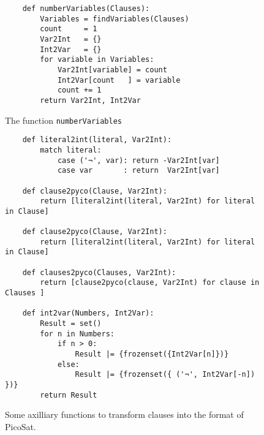 \begin{figure}[!ht]
\centering
\begin{verbatim}
    def numberVariables(Clauses):
        Variables = findVariables(Clauses)
        count     = 1
        Var2Int   = {}
        Int2Var   = {}
        for variable in Variables:
            Var2Int[variable] = count
            Int2Var[count   ] = variable
            count += 1
        return Var2Int, Int2Var             
\end{verbatim}
\vspace*{-0.3cm}
\caption{The function \texttt{numberVariables}}
\label{fig:sudoku-numberVariables}
\end{figure}

\begin{figure}[!ht]
\centering
\begin{verbatim}
    def literal2int(literal, Var2Int):
        match literal:
            case ('¬', var): return -Var2Int[var]
            case var       : return  Var2Int[var]
    
    def clause2pyco(Clause, Var2Int):
        return [literal2int(literal, Var2Int) for literal in Clause]
    
    def clause2pyco(Clause, Var2Int):
        return [literal2int(literal, Var2Int) for literal in Clause]
    
    def clauses2pyco(Clauses, Var2Int):
        return [clause2pyco(clause, Var2Int) for clause in Clauses ]
    
    def int2var(Numbers, Int2Var):
        Result = set()
        for n in Numbers:
            if n > 0:
                Result |= {frozenset({Int2Var[n]})}
            else: 
                Result |= {frozenset({ ('¬', Int2Var[-n]) })}
        return Result
\end{verbatim}
\vspace*{-0.3cm}
\caption{Some axilliary functions to transform clauses into the format of PicoSat.}
\label{fig:sudoku-format}
\end{figure}

